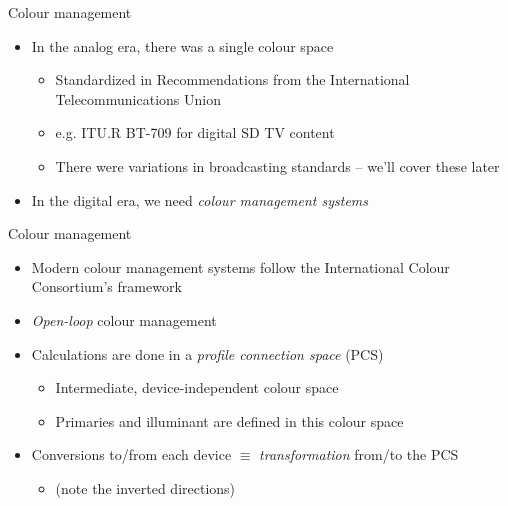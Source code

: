 \documentclass[aspectratio=169,usepdftitle=false]{fireshonks}
\begin{document}
\begin{frame}{Colour management}
    \begin{itemize}
        \item In the analog era, there was a single colour space
              \begin{itemize}
                  \item Standardized in Recommendations from the International Telecommunications Union
                  \item e.g. ITU.R BT-709 \parencite*{BT709} for digital SD TV content
                  \item There were variations in broadcasting standards -- we'll cover these later
              \end{itemize}
        \item In the digital era, we need \emph{colour management systems}
    \end{itemize}
\end{frame}
\begin{frame}{Colour management}
    \begin{itemize}
        \item Modern colour management systems follow the International Colour Consortium's framework \autocite{allen}
        \item \emph{Open-loop} colour management
        \item Calculations are done in a \emph{profile connection space} (PCS)
              \begin{itemize}
                  \item Intermediate, device-independent colour space
                  \item Primaries and illuminant are defined in this colour space
              \end{itemize}
        \item Conversions to/from each device $\equiv$ \emph{transformation} from/to the PCS
              \begin{itemize}
                  \item (note the inverted directions)
              \end{itemize}
    \end{itemize}
\end{frame}
\end{document}
